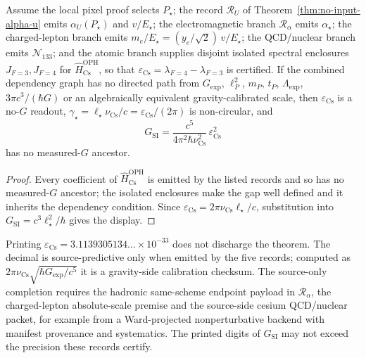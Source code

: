 \begin{theorem}\label{thm:no-g-clock-hierarchy}
Assume the local pixel proof selects \(P_\star\); the record \(\mathcal R_U\) of
Theorem~\ref{thm:no-input-alpha-u} emits \(\alpha_U(P_\star)\) and
\(v/E_\star\); the electromagnetic branch \(\mathcal R_\alpha\) emits
\(\alpha_\star\); the charged-lepton branch emits
\(m_e/E_\star=(y_e/\sqrt2)\,v/E_\star\); the QCD/nuclear branch emits
\(\mathcal N_{133}\); and the atomic branch supplies disjoint isolated
spectral enclosures \(J_{F=3},J_{F=4}\) for
\(\widehat H_{\mathrm{Cs}}^{\mathrm{OPH}}\), so that
\(\varepsilon_{\mathrm{Cs}}=\lambda_{F=4}-\lambda_{F=3}\) is certified. If the
combined dependency graph has no directed path from \(G_{\mathrm{exp}}\),
\(\ell_P^2\), \(m_P\), \(t_P\), \(\Lambda_{\mathrm{exp}}\),
\(3\pi c^3/(\hbar G)\) or an algebraically equivalent gravity-calibrated
scale, then \(\varepsilon_{\mathrm{Cs}}\) is a no-\(G\) readout,
\(\gamma_\star=\ell_\star\nu_{\mathrm{Cs}}/c=\varepsilon_{\mathrm{Cs}}/(2\pi)\)
is non-circular, and
\[
G_{\mathrm{SI}}=\frac{c^5}{4\pi^2\hbar\nu_{\mathrm{Cs}}^2}\,\varepsilon_{\mathrm{Cs}}^2
\]
has no measured-\(G\) ancestor.
\end{theorem}

\begin{proof}
Every coefficient of \(\widehat H_{\mathrm{Cs}}^{\mathrm{OPH}}\) is emitted by
the listed records and so has no measured-\(G\) ancestor; the isolated
enclosures make the gap well defined and it inherits the dependency
condition. Since \(\varepsilon_{\mathrm{Cs}}=2\pi\nu_{\mathrm{Cs}}\ell_\star/c\),
substitution into \(G_{\mathrm{SI}}=c^3\ell_\star^2/\hbar\) gives the display.
\end{proof}

Printing \(\varepsilon_{\mathrm{Cs}}=3.1139305134\ldots\times10^{-33}\) does not
discharge the theorem. The decimal is source-predictive only when emitted by
the five records; computed as \(2\pi\nu_{\mathrm{Cs}}\sqrt{\hbar G_{\mathrm{exp}}/c^5}\)
it is a gravity-side calibration checksum. The source-only completion requires
the hadronic same-scheme endpoint payload in \(\mathcal R_\alpha\), the
charged-lepton absolute-scale premise and the source-side cesium QCD/nuclear
packet, for example from a Ward-projected nonperturbative backend with
manifest provenance and systematics. The printed digits of \(G_{\mathrm{SI}}\)
may not exceed the precision these records certify.



